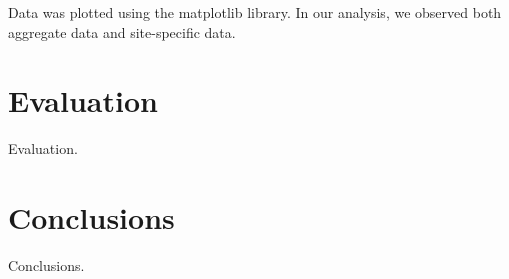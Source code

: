 \documentclass[twocolumn, 10pt, conference]{IEEEtran}
\begin{document}
Data was plotted using the matplotlib library. In our analysis, we observed both aggregate data and site-specific data.

\section{Evaluation}
\label{sec:evaluation}


Evaluation.

\section{Conclusions}
\label{sec:conclusions}



Conclusions.






\end{document}
